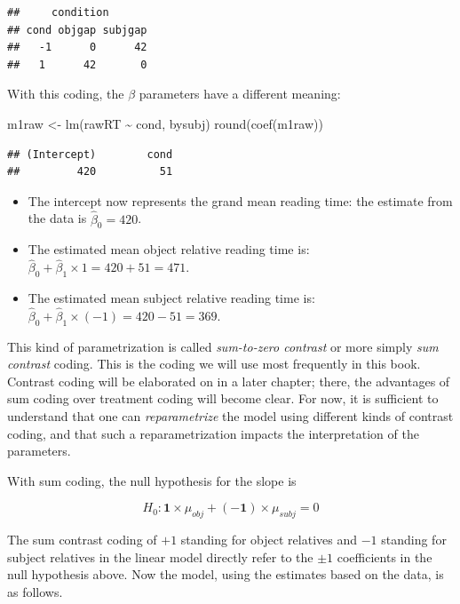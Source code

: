 \documentclass[
  12pt,
]{krantz}
\newenvironment{Shaded}{\begin{snugshade}}{\end{snugshade}}
\newcommand{\FunctionTok}[1]{\textcolor[rgb]{0.00,0.00,0.00}{#1}}
\newcommand{\NormalTok}[1]{#1}
\newcommand{\OtherTok}[1]{\textcolor[rgb]{0.56,0.35,0.01}{#1}}
\newcommand{\SpecialCharTok}[1]{\textcolor[rgb]{0.00,0.00,0.00}{#1}}
\providecommand{\tightlist}{%
  \setlength{\itemsep}{0pt}\setlength{\parskip}{0pt}}
\theoremstyle{definition}
\theoremstyle{definition}
\theoremstyle{definition}
\theoremstyle{definition}
\theoremstyle{remark}
\begin{document}
\begin{verbatim}
##     condition
## cond objgap subjgap
##   -1      0      42
##   1      42       0
\end{verbatim}

With this coding, the \(\beta\) parameters have a different meaning:

\begin{Shaded}
\begin{Highlighting}[]
\NormalTok{m1raw }\OtherTok{\textless{}{-}} \FunctionTok{lm}\NormalTok{(rawRT }\SpecialCharTok{\textasciitilde{}}\NormalTok{ cond, bysubj)}
\FunctionTok{round}\NormalTok{(}\FunctionTok{coef}\NormalTok{(m1raw))}
\end{Highlighting}
\end{Shaded}

\begin{verbatim}
## (Intercept)        cond 
##         420          51
\end{verbatim}

\begin{itemize}
\tightlist
\item
  The intercept now represents the grand mean reading time: the estimate from the data is \(\hat \beta_0=420\).
\item
  The estimated mean object relative reading time is: \(\hat\beta_0+\hat\beta_1\times 1=420+51=471\).
\item
  The estimated mean subject relative reading time is: \(\hat\beta_0+\hat\beta_1\times (-1)=420-51=369\).
\end{itemize}

This kind of parametrization is called \emph{sum-to-zero contrast} or more simply \emph{sum contrast} coding. This is the coding we will use most frequently in this book. Contrast coding will be elaborated on in a later chapter; there, the advantages of sum coding over treatment coding will become clear. For now, it is sufficient to understand that one can \emph{reparametrize} the model using different kinds of contrast coding, and that such a reparametrization impacts the interpretation of the parameters.

With sum coding, the null hypothesis for the slope is

\begin{equation}
H_0: \mathbf{1\times} \mu_{obj} + (\mathbf{-1}) \times\mu_{subj} = 0   
\end{equation}

The sum contrast coding of \(+1\) standing for object relatives and \(-1\) standing for subject relatives in the linear model directly refer to the \(\pm 1\) coefficients in the null hypothesis above.
Now the model, using the estimates based on the data, is as follows.
\end{document}
